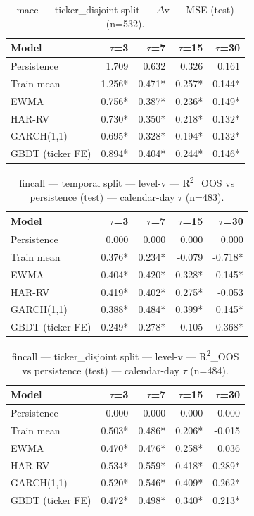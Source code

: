 \begin{table}[t]
\centering
\begin{tabular}{lrrrr}
\toprule
Model & $\tau$=3 & $\tau$=7 & $\tau$=15 & $\tau$=30 \\
\midrule
Persistence & 1.709 & 0.632 & 0.326 & 0.161 \\
Train mean & 1.256* & 0.471* & 0.257* & 0.144* \\
EWMA & 0.756* & 0.387* & 0.236* & 0.149* \\
HAR-RV & 0.730* & 0.350* & 0.218* & 0.132* \\
GARCH(1,1) & 0.695* & 0.328* & 0.194* & 0.132* \\
GBDT (ticker FE) & 0.894* & 0.404* & 0.244* & 0.146* \\
\bottomrule
\end{tabular}
\caption{maec — ticker\_disjoint split — $\Delta$v — MSE (test) (n=532).}
\end{table}

\begin{table}[t]
\centering
\begin{tabular}{lrrrr}
\toprule
Model & $\tau$=3 & $\tau$=7 & $\tau$=15 & $\tau$=30 \\
\midrule
Persistence & 0.000 & 0.000 & 0.000 & 0.000 \\
Train mean & 0.376* & 0.234* & -0.079 & -0.718* \\
EWMA & 0.404* & 0.420* & 0.328* & 0.145* \\
HAR-RV & 0.419* & 0.402* & 0.275* & -0.053 \\
GARCH(1,1) & 0.388* & 0.484* & 0.399* & 0.145* \\
GBDT (ticker FE) & 0.249* & 0.278* & 0.105 & -0.368* \\
\bottomrule
\end{tabular}
\caption{fincall — temporal split — level-v — R\textsuperscript{2}\_OOS vs persistence (test) — calendar-day $\tau$ (n=483).}
\end{table}

\begin{table}[t]
\centering
\begin{tabular}{lrrrr}
\toprule
Model & $\tau$=3 & $\tau$=7 & $\tau$=15 & $\tau$=30 \\
\midrule
Persistence & 0.000 & 0.000 & 0.000 & 0.000 \\
Train mean & 0.503* & 0.486* & 0.206* & -0.015 \\
EWMA & 0.470* & 0.476* & 0.258* & 0.036 \\
HAR-RV & 0.534* & 0.559* & 0.418* & 0.289* \\
GARCH(1,1) & 0.520* & 0.546* & 0.409* & 0.262* \\
GBDT (ticker FE) & 0.472* & 0.498* & 0.340* & 0.213* \\
\bottomrule
\end{tabular}
\caption{fincall — ticker\_disjoint split — level-v — R\textsuperscript{2}\_OOS vs persistence (test) — calendar-day $\tau$ (n=484).}
\end{table}

